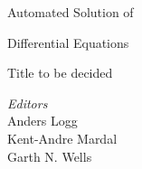 \begin{center}

  \Huge

  Automated Solution of

  Differential Equations

  \vspace{0.5cm}

  \large

  Title to be decided

\end{center}

\vfill

\noindent
\emph{Editors} \\
Anders Logg \\
Kent-Andre Mardal \\
Garth N. Wells

\thispagestyle{empty}
\newpage

